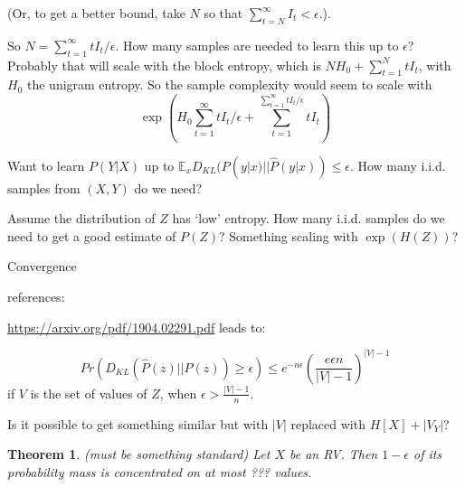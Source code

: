 \documentclass[11pt,letterpaper]{article}
\newcounter{theorem}
\newtheorem{thm}[theorem]{Theorem}
\begin{document}
(Or, to get a better bound, take $N$ so that $\sum_{t=N}^\infty I_t < \epsilon$.).

So $N = \sum_{t=1}^\infty t I_t/\epsilon$.
How many samples are needed to learn this up to $\epsilon$? Probably that will scale with the block entropy, which is $N H_0 + \sum_{t=1}^N t I_t$, with $H_0$ the unigram entropy.
So the sample complexity would seem to scale with
$$\exp\left(H_0 \sum_{t=1}^\infty t I_t/\epsilon + \sum_{t=1}^{\sum_{t=1}^\infty t I_t/\epsilon} t I_t\right)$$


Want to learn $P(Y|X)$ up to $\mathbb{E}_x D_{KL}(P(y|x)||\hat P(y|x)) \leq \epsilon$.
How many i.i.d. samples from $(X,Y)$ do we need?

Assume the distribution of $Z$ has `low' entropy.
How many i.i.d. samples do we need to get a good estimate of $P(Z)$?
Something scaling with $\exp(H(Z))$?

Convergence

references:

\url{https://arxiv.org/pdf/1904.02291.pdf} leads to:

$$Pr(D_{KL}(\hat P(z)||P(z)) \geq \epsilon) \leq e^{-n\epsilon} \left(\frac{e\epsilon n}{|V|-1}\right)^{|V|-1}$$
if $V$ is the set of values of $Z$, when $\epsilon > \frac{|V|-1}{n}$.


Is it possible to get something similar but with $|V|$ replaced with $H[X]+|V_Y|$?

\begin{thm}(must be something standard)
Let $X$ be an RV. Then $1-\epsilon$ of its probability mass is concentrated on at most
???
values.
\end{thm}
\end{document}

